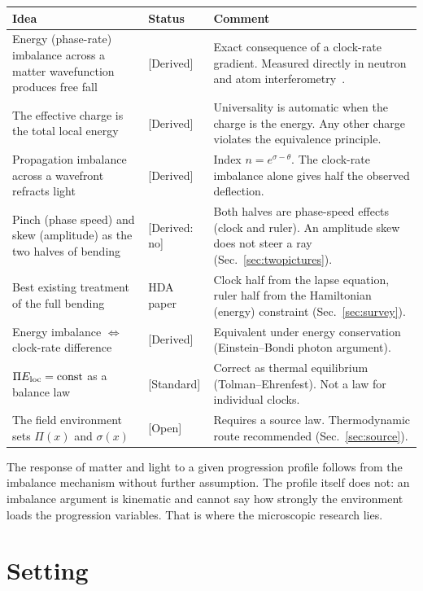 \documentclass[11pt]{article}
\newcommand{\Pg}{\Pi}
\newcommand{\thP}{\theta}
\newcommand{\sgP}{\sigma}
\newcommand{\st}[1]{\textsf{\small[#1]}}
\theoremstyle{plain}
\theoremstyle{remark}
\begin{document}
\begin{longtable}{@{}p{}p{}p{}@{}}
\toprule
Idea & Status & Comment \\
\midrule
Energy (phase-rate) imbalance across a matter wavefunction produces free fall & \st{Derived} & Exact consequence of a clock-rate gradient. Measured directly in neutron and atom interferometry~\cite{COW1975}. \\
The effective charge is the total local energy & \st{Derived} & Universality is automatic when the charge is the energy. Any other charge violates the equivalence principle. \\
Propagation imbalance across a wavefront refracts light & \st{Derived} & Index $n=e^{\sgP-\thP}$. The clock-rate imbalance alone gives half the observed deflection. \\
Pinch (phase speed) and skew (amplitude) as the two halves of bending & \st{Derived: no} & Both halves are phase-speed effects (clock and ruler). An amplitude skew does not steer a ray (Sec.~\ref{sec:twopictures}). \\
Best existing treatment of the full bending & HDA paper & Clock half from the lapse equation, ruler half from the Hamiltonian (energy) constraint (Sec.~\ref{sec:survey}). \\
Energy imbalance $\Leftrightarrow$ clock-rate difference & \st{Derived} & Equivalent under energy conservation (Einstein--Bondi photon argument). \\
$\Pg E_{\rm loc}=\text{const}$ as a balance law & \st{Standard} & Correct as thermal equilibrium (Tolman--Ehrenfest). Not a law for individual clocks. \\
The field environment sets $\Pg(x)$ and $\sgP(x)$ & \st{Open} & Requires a source law. Thermodynamic route recommended (Sec.~\ref{sec:source}). \\
\bottomrule
\end{longtable}

The response of matter and light to a given progression profile follows from the imbalance mechanism without further assumption. The profile itself does not: an imbalance argument is kinematic and cannot say how strongly the environment loads the progression variables. That is where the microscopic research lies.

\section{Setting}
\end{document}
